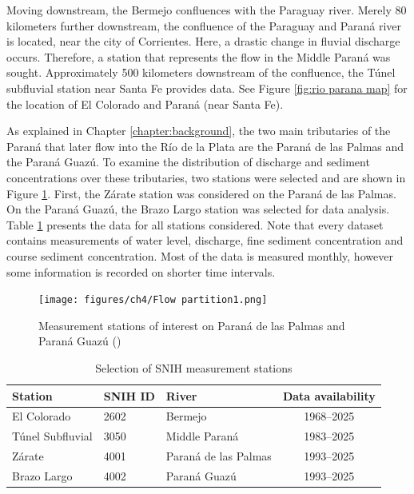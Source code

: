 Moving downstream, the Bermejo confluences with the Paraguay river. Merely 80 kilometers further downstream, the confluence of the Paraguay and Paraná river is located, near the city of Corrientes. Here, a drastic change in fluvial discharge occurs. Therefore, a station that represents the flow in the Middle Paraná was sought. Approximately 500 kilometers downstream of the confluence, the Túnel subfluvial station near Santa Fe provides data. See Figure \ref{fig:rio parana map} for the location of El Colorado and Paraná (near Santa Fe). 

As explained in Chapter \ref{chapter:background}, the two main tributaries of the Paraná that later flow into the Río de la Plata are the Paraná de las Palmas and the Paraná Guazú. To examine the distribution of discharge and sediment concentrations over these tributaries, two stations were selected and are shown in Figure \ref{fig:flow partition}. First, the Zárate station was considered on the Paraná de las Palmas. On the Paraná Guazú, the Brazo Largo station was selected for data analysis. Table \ref{tab:stations data collection} presents the data for all stations considered. Note that every dataset contains measurements of water level, discharge, fine sediment concentration and course sediment concentration. Most of the data is measured monthly, however some information is recorded on shorter time intervals. 

\begin{figure}[H]
    \centering
    \texttt{[image: figures/ch4/Flow partition1.png]}
    \caption{Measurement stations of interest on Paraná de las Palmas and Paraná Guazú (\cite{googleearth2025})}
    \label{fig:flow partition}
\end{figure}

\begin{table}[H]
    \centering
    \renewcommand{\arraystretch}{1.2} %
    \setlength{\tabcolsep}{8pt}       %
    \caption{Selection of SNIH measurement stations}
    \begin{tabular}{lllc}
        \toprule
        Station & SNIH ID & River & Data availability \\
        \midrule
        El Colorado         & 2602 & Bermejo               & 1968--2025 \\
        Túnel Subfluvial    & 3050 & Middle Paraná         & 1983--2025 \\
        Zárate              & 4001 & Paraná de las Palmas  & 1993--2025 \\
        Brazo Largo         & 4002 & Paraná Guazú          & 1993--2025 \\
        \bottomrule
    \end{tabular}
    
    \label{tab:stations data collection}
\end{table}

